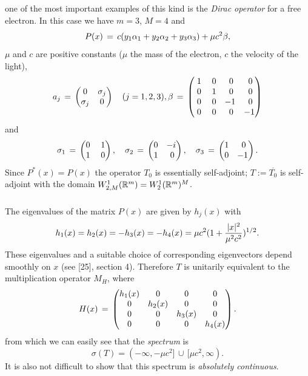 \documentclass[11pt,twoside]{article}
\begin{document}
\subparagraph*{}
one of the most important examples of this kind is the \textit{Dirac operator}
for a free electron.
In this case we have $m=3$, $M=4$ and
\[
P(x) \= c(y_1 \alpha_1 + y_2 \alpha_2 + y_3 \alpha_3) + \mu c^2 \beta,
\]
$\mu$ and $c$ are positive constants ($\mu$ the mass of the electron,
$c$ the velocity of the light),
\[
a_j \=
\begin{pmatrix}
0        & \sigma_j \\
\sigma_j & 0
\end{pmatrix}
\quad (j=1,2,3),
\beta \=
\begin{pmatrix}
\;1 & \;0 & \;0 & \;0 \\
\;0 & \;1 & \;0 & \;0 \\
\;0 & \;0 &  -1 & \;0 \\
\;0 & \;0 & \;0 &  -1
\end{pmatrix}
\]
and
\[
      \sigma_1 \= \begin{pmatrix} 0 & \; 1 \\ 1 & \; 0 \end{pmatrix},
\quad \sigma_2 \= \begin{pmatrix} 0 &   -i \\ 1 & \; 0 \end{pmatrix},
\quad \sigma_3 \= \begin{pmatrix} 1 & \; 0 \\ 0 &   -1 \end{pmatrix}.
\]
Since $P^*(x) = P(x)$ the operator $T_0$ is essentially self-adjoint;
$T := \overline{T_0}$ is self-adjoint with the domain
$W^1_{2,M}(\R^m) = W^1_2(\R^m)^M$.

\subparagraph*{}
The eigenvalues of the matrix $P(x)$ are given by $h_j(x)$ with
\[
h_1(x) = h_2(x) = -h_3(x) = -h_4(x)
= \mu c^2 (1 + \frac{\abs{x} ^2}{\mu^2 c^2})^{1/2}.
\]
These eigenvalues and a suitable choice of corresponding eigenvectors
depend smoothly on $x$ (see [25], section 4).
Therefore $T$ is unitarily equivalent to the multiplication operator $M_H$,
where
\[
H(x) \=
\begin{pmatrix}
h_1(x) & 0      & 0      & 0      \\
0      & h_2(x) & 0      & 0      \\
0      & 0      & h_3(x) & 0      \\
0      & 0      & 0      & h_4(x)
\end{pmatrix}.
\]
from which we can easily see that the \textit{spectrum} is
\[
\sigma(T) = (-\infty, -\mu c^2] \, \cup \, [\mu c^2,\infty).
\]
It is also not difficult to show
that this spectrum is \textit{absolutely continuous}.
\end{document}
